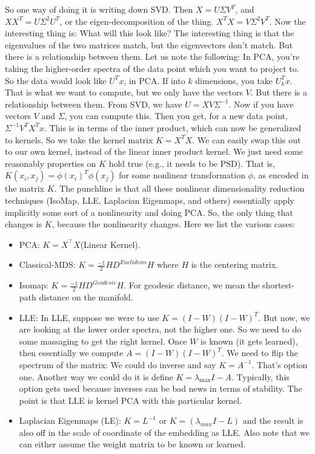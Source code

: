So one way of doing it is writing down SVD. Then $X = U\Sigma V^T$, and $XX^T = U\Sigma^2 U^T$, or the eigen-decomposition of the thing. $X^TX = V\Sigma^2 V^T$. Now the interesting thing is: What will this look like? The interesting thing is that the eigenvalues of the two matrices match, but the eigenvectors don't match. But there is a relationship between them. Let us note the following: In PCA, you're taking the higher-order spectra of the data point which you want to project to. So the data would look like $U^Tx$, in PCA. If into $k$ dimensions, you take $U_k^Tx$. That is what we want to compute, but we only have the vectors $V$. But there is a relationship between them. From SVD, we have $U = XV\Sigma^{-1}$. Now if you have vectors $V$ and $\Sigma$, you can compute this. Then you get, for a new data point, $\Sigma^{-1}V^TX^Tx$. This is in terms of the inner product, which can now be generalized to kernels. So we take the kernel matrix $K = X^TX$. We can easily swap this out to our own kernel, instead of the linear inner product kernel. We just need some reasonably properties on $K$ hold true (e.g., it needs to be PSD). That is, $K(x_i, x_j) = \phi(x_i)^T\phi(x_j)$ for some nonlinear transformation $\phi$, as encoded in the matrix $K$. The punchline is that all these nonlinear dimensionality reduction techniques (IsoMap, LLE, Laplacian Eigenmaps, and others) essentially apply implicitly some sort of a nonlinearity and doing PCA. So, the only thing that changes is $K$, because the nonlinearity changes. Here we list the various cases:

\begin{itemize}
\item PCA: $K=X^\intercal X$(Linear Kernel).
\item Classical-MDS: $K=\frac{-1}{2} HD^{Euclidean}H$ where $H$ is the centering matrix. 
\item Isomap: $K=\frac{-1}{2} HD^{Geodesic}H$. For geodesic distance, we mean the shortest-path distance on the manifold.
\item LLE: In LLE, suppose we were to use $K = (I - W)(I - W)^T$. But now, we are looking at the lower order spectra, not the higher one. So we need to do some massaging to get the right kernel. Once $W$ is known (it gets learned), then essentially we compute $A = (I - W)(I - W)^T$. We need to flip the spectrum of the matrix: We could do inverse and say $K = A^{-1}$. That's option one. Another way we could do it is define $K = \lambda_{\max}I - A$. Typically, this option gets used because inverses can be bad news in terms of stability. The point is that LLE is kernel PCA with this particular kernel.  
\item Laplacian Eigenmaps (LE): $K=L^{-1}$ or $K=(\lambda_{max} I - L)$ and the result is also off in the scale of coordinate of the embedding as LLE. Also note that we can either assume the weight matrix to be known or learned.
\end{itemize}

